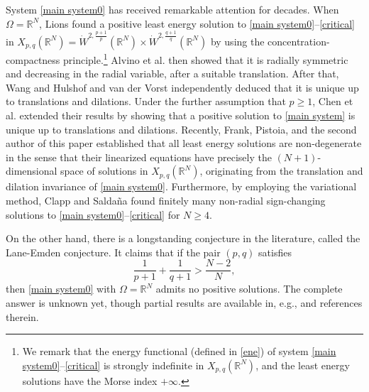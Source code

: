 \documentclass[reqno]{amsart}
\theoremstyle{remark}
\newcommand{\R}{\mathbb{R}}
\renewcommand{\(}{\left(}
\renewcommand{\)}{\right)}
\numberwithin{equation}{section}
\begin{document}
System \eqref{main system0} has received remarkable attention for decades.
When $\Omega = \R^N$, Lions \cite{Li} found a positive least energy solution to \eqref{main system0}--\eqref{critical}
in $X_{p,q}(\R^N) = \dot{W}^{2,\frac{p+1}{p}}(\R^N) \times \dot{W}^{2,\frac{q+1}{q}}(\R^N)$ by using the concentration-compactness principle.\footnote{We remark
that the energy functional (defined in \eqref{ene}) of system \eqref{main system0}--\eqref{critical} is strongly indefinite in $X_{p,q}(\R^N)$,
and the least energy solutions have the Morse index $+\infty$.}
Alvino et al. \cite{ALT} then showed that it is radially symmetric and decreasing in the radial variable, after a suitable translation.
After that, Wang \cite{Wa} and Hulshof and van der Vorst \cite{HV} independently deduced that it is unique up to translations and dilations.
Under the further assumption that $p \ge 1$, Chen et al. \cite{CLO} extended their results by showing that a positive solution to \eqref{main system} is unique up to translations and dilations.
Recently, Frank, Pistoia, and the second author of this paper \cite{FKP} established that all least energy solutions are non-degenerate in the sense that their linearized equations have precisely the $(N+1)$-dimensional space
of solutions in $X_{p,q}(\R^N)$, originating from the translation and dilation invariance of \eqref{main system0}.
Furthermore, by employing the variational method, Clapp and Salda\~na \cite{CS} found finitely many non-radial sign-changing solutions to \eqref{main system0}--\eqref{critical} for $N \ge 4$.

On the other hand, there is a longstanding conjecture in the literature, called the Lane-Emden conjecture. It claims that if the pair $(p,q)$ satisfies
\begin{equation}\label{subcritical}
\frac{1}{p+1} + \frac{1}{q+1} > \frac{N-2}{N},
\end{equation}
then \eqref{main system0} with $\Omega = \R^N$ admits no positive solutions. The complete answer is unknown yet, though partial results are available in, e.g., \cite{So, CH} and references therein.
\end{document}
